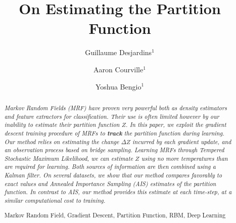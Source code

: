 \documentclass[runningheads,a4paper]{llncs}
\newcommand{\keywords}[1]{\par\addvspace\baselineskip
\noindent\keywordname\enspace\ignorespaces#1}
\begin{document}
\mainmatter  %

\title{On Estimating the Partition Function}


%
\author{Guillaume Desjardins$^1$ \and Aaron Courville$^1$ \and Yoshua Bengio$^1$}
%


%
%

\maketitle

\begin{abstract}

\emph{
Markov Random Fields (MRF) have proven very powerful both as density estimators and feature extractors for classification. Their use is often limited however by our inability to estimate their partition function $Z$. In this paper, we exploit the gradient descent training procedure of MRFs to {\bf track} the partition function during learning. Our method relies on estimating the change $\Delta Z$ incurred by each gradient update, and an observation process based on bridge sampling. Learning MRFs through Tempered Stochastic Maximum Likelihood, we can estimate $Z$ using no more temperatures than are required for learning. Both sources of information are then combined using a Kalman filter. On several datasets, we show that our method compares favorably to exact values and Annealed Importance Sampling (AIS) estimates of the partition function. In contrast to AIS, our method provides this estimate at each time-step, at a similar computational cost to training.
}

\keywords{Markov Random Field, Gradient Descent, Partition Function, RBM, Deep Learning}

\end{abstract}
\end{document}
